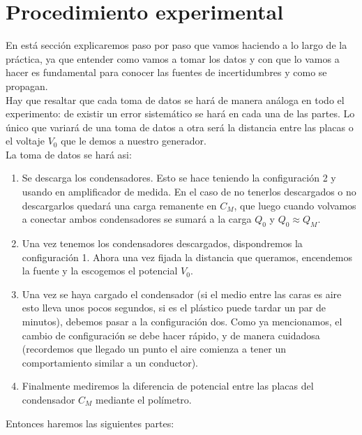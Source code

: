 \documentclass[12pt,a4paper]{article}
\begin{document}
\section{Procedimiento experimental}

En está sección explicaremos paso por paso que vamos haciendo a lo largo de la práctica, ya que entender como vamos a tomar los datos y con que lo vamos a hacer es fundamental para conocer las fuentes de incertidumbres y como se propagan. \\

Hay que resaltar que cada toma de datos se hará de manera análoga en todo el experimento: de existir un error sistemático se hará en cada una de las partes. Lo único que variará de una toma de datos a otra será la distancia entre las placas o el voltaje $V_0$ que le demos a nuestro generador. \\

La toma de datos se hará asi:

\begin{enumerate}
\item Se descarga los condensadores. Esto se hace teniendo la configuración 2 y usando en amplificador de medida. En el caso de no tenerlos descargados o no descargarlos quedará una carga remanente en $C_M$, que luego cuando volvamos a conectar ambos condensadores se sumará a la carga $Q_0$ y $Q_0 \approx Q_M$.

\item Una vez tenemos los condensadores descargados, dispondremos la configuración 1. Ahora una vez fijada la distancia que queramos, encendemos la fuente y la escogemos el potencial $V_0$.

\item Una vez se haya cargado el condensador (si el medio entre las caras es aire esto lleva unos pocos segundos, si es el plástico puede tardar un par de minutos), debemos pasar a la configuración dos. Como ya mencionamos, el cambio de configuración se debe hacer rápido, y de manera cuidadosa (recordemos que llegado un punto el aire comienza a tener un comportamiento similar a un conductor). 

\item Finalmente mediremos la diferencia de potencial entre las placas del condensador $C_M$ mediante el polímetro.

\end{enumerate}

Entonces haremos las siguientes partes:
\end{document}
